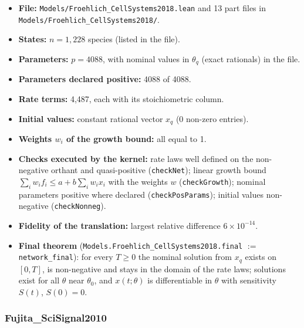 \begin{itemize}\itemsep0pt\small
\item \textbf{File:} \texttt{Models/Froehlich\_CellSystems2018.lean} and 13 part files in \texttt{Models/Froehlich\_CellSystems2018/}.
\item \textbf{States:} $n=1{,}228$ species (listed in the file).
\item \textbf{Parameters:} $p=4088$, with nominal values in \texttt{$\theta_q$} (exact rationals) in the file.
\item \textbf{Parameters declared positive:} 4088 of 4088.
\item \textbf{Rate terms:} 4{,}487, each with its stoichiometric column.
\item \textbf{Initial values:} constant rational vector $x_q$ (0 non-zero entries).
\item \textbf{Weights $w_i$ of the growth bound:} all equal to 1.
\item \textbf{Checks executed by the kernel:} rate laws well defined on the non-negative orthant and quasi-positive (\texttt{checkNet}); linear growth bound $\sum_iw_if_i\le a+b\sum_iw_ix_i$ with the weights $w$ (\texttt{checkGrowth}); nominal parameters positive where declared (\texttt{checkPosParams}); initial values non-negative (\texttt{checkNonneg}).
\item \textbf{Fidelity of the translation:} largest relative difference $6\times10^{-14}$.
\item \textbf{Final theorem} (\texttt{Models.Froehlich\_CellSystems2018.final} $:=$ \texttt{network\_final}): for every $T\ge0$ the nominal solution from $x_q$ exists on $[0,T]$, is non-negative and stays in the domain of the rate laws; solutions exist for all $\theta$ near $\theta_0$, and $x(t;\theta)$ is differentiable in $\theta$ with sensitivity $S(t)$, $S(0)=0$.
\end{itemize}

\subsubsection*{Fujita\_SciSignal2010}

